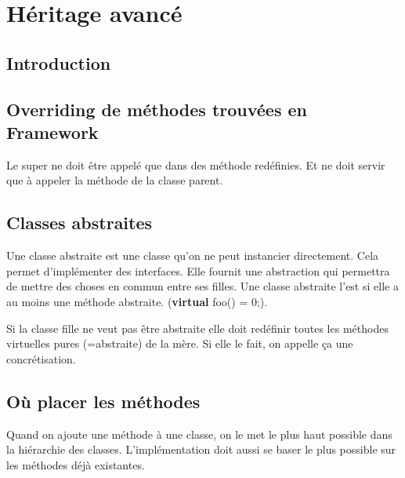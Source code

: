 \section{Héritage avancé}



\subsection{Introduction}



\subsection{Overriding de méthodes trouvées en Framework}
Le super ne doit être appelé que dans des méthode redéfinies. Et ne doit servir que à appeler la méthode de la classe parent.



\subsection{Classes abstraites}
Une classe abstraite est une classe qu’on ne peut instancier directement.
Cela permet d’implémenter des interfaces. Elle fournit une abstraction qui permettra de mettre des choses en commun entre ses filles.
Une classe abstraite l’est si elle a au moins une méthode abstraite. (\textbf{virtual} foo() = 0;).

Si la classe fille ne veut pas être abstraite elle doit redéfinir toutes les méthodes virtuelles pures (=abstraite) de la mère. Si elle le fait, on appelle ça une concrétisation.



\subsection{Où placer les méthodes}
Quand on ajoute une méthode à une classe, on le met le plus haut possible dans la hiérarchie des classes. L’implémentation doit aussi se baser le plus possible sur les méthodes déjà existantes.